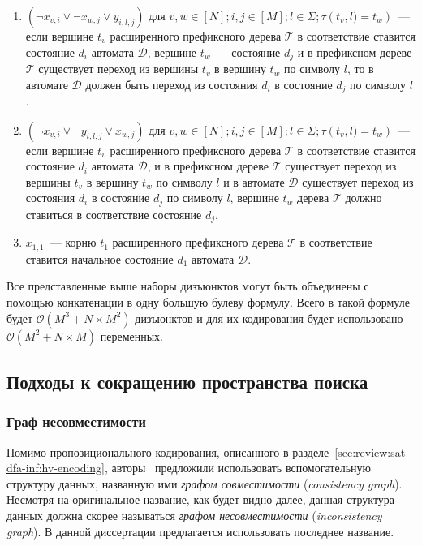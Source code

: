 \begin{enumerate}
  \item $\left(\neg x_{v,i} \vee \neg x_{w,j} \vee y_{i,l,j}\right)$ для $v,w \in \left[N\right]; i,j \in \left[M\right];l \in \Sigma; \tau\left(t_{v},l) = t_{w}\right)$~{---} если вершине $t_{v}$ расширенного префиксного дерева $\mathcal{T} $ в соответствие ставится состояние $d_{i}$ автомата $\mathcal{D}$, вершине $t_{w}$~{---} состояние $d_{j}$ и в префиксном дереве $\mathcal{T}$ существует переход из вершины $t_{v}$ в вершину $t_{w}$ по символу $l$, то в автомате $\mathcal{D}$ должен быть переход из состояния $d_{i}$ в состояние $d_{j}$ по символу $l$.
  \item $\left(\neg x_{v,i} \vee \neg y_{i,l,j} \vee x_{w,j}\right)$ для $v,w \in \left[N\right]; i,j \in \left[M\right];l \in \Sigma; \tau\left(t_{v},l) = t_{w}\right)$~{---} если вершине $t_{v}$ расширенного префиксного дерева $\mathcal{T} $ в соответствие ставится состояние $d_{i}$ автомата $\mathcal{D}$, и в префиксном дереве $\mathcal{T}$ существует переход из вершины $t_{v}$ в вершину $t_{w}$ по символу $l$ и в автомате $\mathcal{D}$ существует переход из состояния $d_{i}$ в состояние $d_{j}$ по символу $l$, вершине $t_{w}$ дерева $\mathcal{T}$ должно ставиться в соответствие состояние $d_{j}$.
  \item $x_{1,1}$~{---} корню $t_{1}$ расширенного префиксного дерева $\mathcal{T} $ в соответствие ставится начальное состояние $d_{1}$ автомата $\mathcal{D}$.
\end{enumerate}

Все представленные выше наборы дизъюнктов могут быть объединены с помощью конкатенации в одну большую булеву формулу. Всего в такой формуле будет $\mathcal{O}(M^{3} + N \times M^{2})$ дизъюнктов и для их кодирования будет использовано $\mathcal{O}(M^2 + N \times M)$ переменных.

\subsection{Подходы к сокращению пространства поиска}
\label{sec:review:sat-dfa-inf:sym-breaking}


\subsubsection{Граф несовместимости}

Помимо пропозиционального кодирования, описанного в разделе~\ref{sec:review:sat-dfa-inf:hv-encoding}, авторы~\cite{heule-icgi10} предложили использовать вспомогательную структуру данных, названную ими \emph{графом совместимости} (\emph{consistency graph}).
Несмотря на оригинальное название, как будет видно далее, данная структура данных должна скорее называться \emph{графом несовместимости} (\emph{inconsistency graph}).
В данной диссертации предлагается использовать последнее название.

